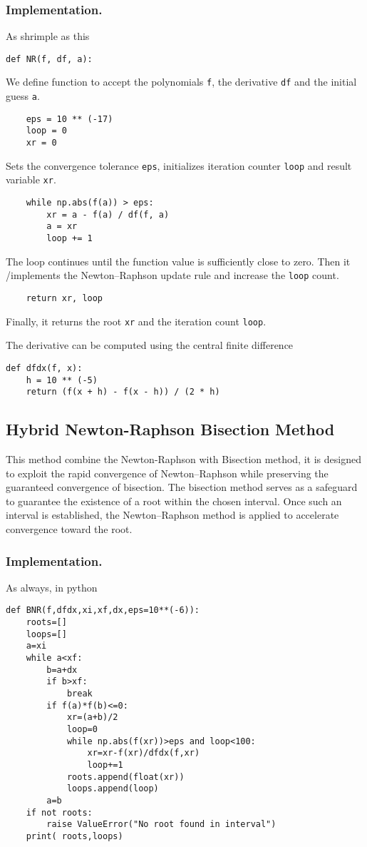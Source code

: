 \documentclass[../../../main.tex]{subfiles}
\begin{document}
\subsubsection{Implementation.}
As shrimple as this
\begin{verbatim}
def NR(f, df, a):
\end{verbatim}
We define function to accept the polynomials \verb|f|, the derivative \verb|df| and the initial guess \verb|a|.
\begin{verbatim}
    eps = 10 ** (-17)
    loop = 0
    xr = 0
\end{verbatim}
Sets the convergence tolerance \verb|eps|, initializes iteration counter \verb|loop| and result variable \verb|xr|.
\begin{verbatim}
    while np.abs(f(a)) > eps:
        xr = a - f(a) / df(f, a)
        a = xr
        loop += 1
\end{verbatim}
The loop continues until the function value is sufficiently close to zero.
Then it /implements the Newton–Raphson update rule and  increase the \verb|loop| count.
\begin{verbatim}
    return xr, loop
\end{verbatim}
Finally, it returns the root \verb|xr| and the iteration count \verb|loop|.

The derivative can be computed using the central finite difference
\begin{verbatim}
def dfdx(f, x):
    h = 10 ** (-5)
    return (f(x + h) - f(x - h)) / (2 * h)
\end{verbatim}

\subsection{Hybrid Newton-Raphson Bisection Method}
This method combine the Newton-Raphson with Bisection method, it is designed to exploit the rapid convergence of Newton–Raphson while preserving the guaranteed convergence of bisection.
The bisection method serves as a safeguard to guarantee the existence of a root within the chosen interval.
Once such an interval is established, the Newton–Raphson method is applied to accelerate convergence toward the root.

\subsubsection*{Implementation.} As always, in python
\begin{verbatim}
def BNR(f,dfdx,xi,xf,dx,eps=10**(-6)):
    roots=[]
    loops=[]
    a=xi
    while a<xf:
        b=a+dx 
        if b>xf:
            break
        if f(a)*f(b)<=0:
            xr=(a+b)/2
            loop=0 
            while np.abs(f(xr))>eps and loop<100:
                xr=xr-f(xr)/dfdx(f,xr)
                loop+=1
            roots.append(float(xr))
            loops.append(loop)
        a=b
    if not roots:
        raise ValueError("No root found in interval")
    print( roots,loops)
\end{verbatim}
\end{document}
